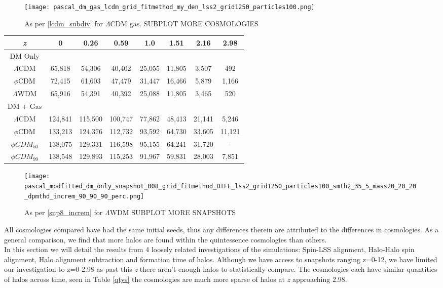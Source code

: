 \documentclass[a4paper,fleqn,usenatbib]{mnras}
\def \lcdm{$\Lambda$CDM }
\def \lwdm{$\Lambda$WDM }
\def \qcdm{$\phi$CDM }
\def \qcdmo{$\phi CDM_{50}$ }
\def \qcdmoo{$\phi CDM_{99}$ }
\begin{document}
\begin{figure}
\centering
\texttt{[image: pascal\_dm\_gas\_lcdm\_grid\_fitmethod\_my\_den\_lss2\_grid1250\_particles100.png]} 
\caption{As per \ref{lcdm_subdiv} for \lcdm gas. SUBPLOT MORE COSMOLOGIES }\label{gaslcdm_subdiv}
\end{figure}


\begin{table*}
\centering
\begin{tabular}{|c|c|c|c|c|c|c|c|}
	
	\hline
	\textit{z} & 0 & 0.26 & 0.59 & 1.0 & 1.51 & 2.16 & 2.98\\
	\hline
	DM Only\\
	\hline
    \lcdm & 65,818 & 54,306 & 40,402 & 25,055 & 11,805 & 3,507 & 492 \\
	\hline
    \qcdm & 72,415 & 61,603 & 47,479 & 31,447 & 16,466 & 5,879 & 1,166 \\
	\hline 
    \lwdm & 65,916 & 54,391 & 40,392 & 25,088 & 11,805 & 3,465 & 520 \\
	\hline
    DM + Gas\\
	\hline  
	 \lcdm & 124,841 & 115,500 & 100,747 & 77,862 & 48,413 & 21,141 & 5,246 \\
	\hline 
	 \qcdm & 133,213 & 124,376 & 112,732 & 93,592 & 64,730& 33,605 & 11,121 \\
	\hline 
	\qcdmo & 138,075 & 129,331 & 116,598 & 95,155 & 64,241 & 31,720 & - \\
	\hline 
	\qcdmoo & 138,548 & 129,893 & 115,253 & 91,967 & 59,831 & 28,003 & 7,851 \\
	\hline 
    
\end{tabular}
\caption{This table shows the number of halos for each cosmology and snapshot therein, for halos comprised of more than 100 particles each}\label{qtys}
\end{table*}

\begin{figure}
\centering
\texttt{[image: pascal\_modfitted\_dm\_only\_snapshot\_008\_grid\_fitmethod\_DTFE\_lss2\_grid1250\_particles100\_smth2\_35\_5\_mass20\_20\_20\_dpmthd\_increm\_90\_90\_90\_perc.png]} 
\caption{As per \ref{snp8_increm} for \lwdm{} SUBPLOT MORE SNAPSHOTS }\label{cde099_subdiv}
\end{figure}

All cosmologies compared have had the same initial seeds, thus any differences therein are attributed to the differences in cosmologies. As a general comparison, we find that more halos are found within the quintessence cosmologies than others.
\\
In this section we will detail the results from 4 loosely related investigations of the simulations: Spin-LSS alignment, Halo-Halo spin alignment, Halo alignment subtraction and formation time of halos. Although we have access to snapshots ranging z=0-12, we have limited our investigation to z=0-2.98 as past this \textit{z} there aren't enough halos to statistically compare. The cosmologies each have similar quantities of halos across time, seen in Table \ref{qtys} the cosmologies are much more sparse of halos at \textit{z} approaching 2.98. 
\end{document}
